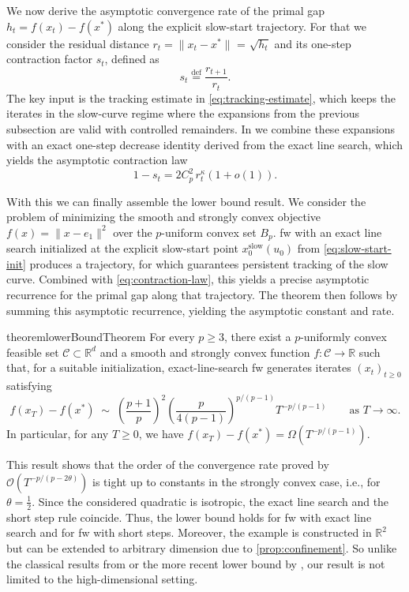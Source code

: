 \documentclass{article}
\newcommand{\R}{\mathbb{R}}
\newcommand{\bigo}[1]{\mathcal{O}( #1 )}
\newcommand\linktoproof[1]{{\hspace{-0.3em}\normalfont[{\hyperlink{proof:#1}{$\downarrow$}}]}}
\newcommand{\defi}{\stackrel{\mathrm{\scriptscriptstyle def}}{=}}
\begin{document}
We now derive the asymptotic convergence rate of the primal gap $h_t=f(x_t)-f(x^*)$ along the explicit slow-start trajectory.
For that we consider the residual distance $r_t = \|x_t-x^*\|$ = $\sqrt{h_t}$ and its one-step contraction factor $s_t$, defined as
\[
    s_t\defi\frac{r_{t+1}}{r_t}.
\]
The key input is the tracking estimate in \eqref{eq:tracking-estimate}, which keeps the iterates in the slow-curve regime where the expansions from the previous subsection are valid with controlled remainders.
In  we combine these expansions with an exact one-step decrease identity derived from the exact line search, which yields the asymptotic contraction law
\begin{equation}
    \label{eq:contraction-law}
    1-s_t = 2C_p^2\,r_t^\kappa(1+o(1)).
\end{equation}

With this we can finally assemble the lower bound result.
We consider the problem of minimizing the smooth and strongly convex objective $f(x) = \|x-e_1\|^2$ over the $p$-uniform convex set $B_p$.
\gls{fw} with an exact line search initialized at the explicit slow-start point $x_0^{\mathrm{slow}}(u_0)$ from \eqref{eq:slow-start-init} produces a trajectory, for which  guarantees persistent tracking of the slow curve.
Combined with \eqref{eq:contraction-law}, this yields a precise asymptotic recurrence for the primal gap along that trajectory.
The theorem then follows by summing this asymptotic recurrence, yielding the asymptotic constant and rate.

\begin{restatable}{theorem}{lowerBoundTheorem}\label{thm:lower-bound}\linktoproof{thm:lower-bound}
    For every $p\ge 3$, there exist a $p$-uniformly convex feasible set $\mathcal C \subset\mathbb R^d$ and a smooth and strongly convex function $f:\mathcal C \to\mathbb R$ such that, for a suitable initialization, exact-line-search \gls{fw} generates iterates $(x_t)_{t\geq 0}$ satisfying
    \begin{equation}\label{eq:lower-bound}
        f(x_T)-f(x^*)
        \;\sim\;
    \left(\frac{p+1}{p}\right)^2
    \left(\frac{p}{4(p-1)}\right)^{p/(p-1)}
    T^{-p/(p-1)}
        \qquad\text{as }T\to\infty.
    \end{equation}
    In particular, for any $T \geq 0$, we have $f(x_T)-f(x^*) = \Omega \left(T^{-p/(p-1)} \right)$.
\end{restatable}

This result shows that the order of the convergence rate proved by \citet{kerdreux2021projection} $\bigo{T^{-p/(p-2\theta)}}$ is tight up to constants in the strongly convex case, i.e., for $\theta = \frac12$.
Since the considered quadratic is isotropic, the exact line search and the short step rule coincide.
Thus, the lower bound holds for \gls{fw} with exact line search and for \gls{fw} with short steps.
Moreover, the example is constructed in $\R^2$ but can be extended to arbitrary dimension due to \cref{prop:confinement}.
So unlike the classical results from \citet{nemirovsky1985problem} or the more recent lower bound by \citet{grimmer2026uniform}, our result is not limited to the high-dimensional setting.
\end{document}
